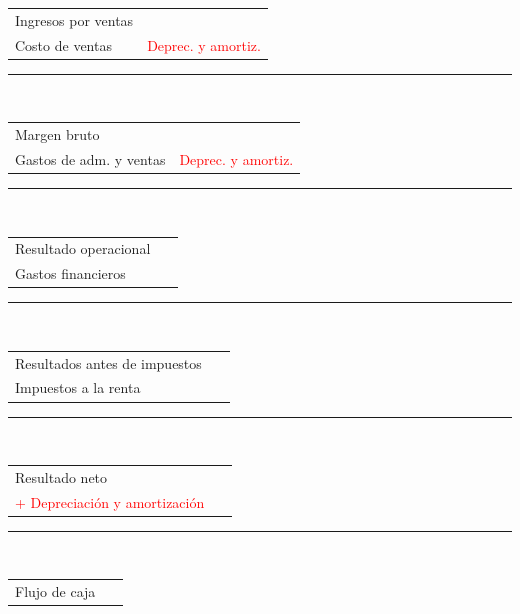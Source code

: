 \documentclass{templateNote}
\begin{document}
\begin{tcolorbox}
    \begin{em}
        \begin{center}
            \begin{tabular}{l l}
                Ingresos por ventas & ~ \\
                Costo de ventas & \textcolor{red}{Deprec. y amortiz.} \\
            \end{tabular}
            \rule{11cm}{0.2 mm} \\[0.1 cm]
            \begin{tabular}{l l}
                Margen bruto & ~ \\
                Gastos de adm. y ventas & \textcolor{red}{Deprec. y amortiz.} \\
            \end{tabular}
            \rule{11cm}{0.2 mm} \\[0.1 cm]
            \begin{tabular}{l l}
                Resultado operacional & ~ \\
                Gastos financieros & ~ \\
            \end{tabular}
            \rule{11cm}{0.2 mm} \\[0.1 cm]
            \begin{tabular}{l l}
                Resultados antes de impuestos & ~ \\
                Impuestos a la renta & ~ \\
            \end{tabular}
            \rule{11cm}{0.2 mm} \\[0.1 cm]
            \begin{tabular}{l l}
                Resultado neto & ~ \\
                \textcolor{red}{+ Depreciación y amortización} & ~ \\
            \end{tabular}
            \rule{11cm}{0.2 mm} \\[0.1 cm]
            \begin{tabular}{l l}
                Flujo de caja & ~ \\
            \end{tabular}
        \end{center}
    \end{em}
\end{tcolorbox}
\end{document}
